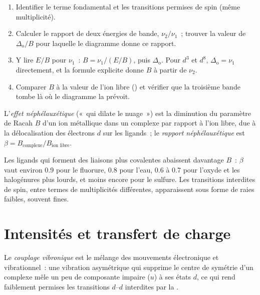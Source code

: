 \begin{method}\label{met:b3:complex-spectra-magnetism:read-ts}
\begin{enumerate}
  \item Identifier le terme fondamental et les transitions permises de spin
        (même multiplicité).
  \item Calculer le rapport de deux énergies de bande, $\nu_2/\nu_1$~;
        trouver la valeur de $\Delta_{\mathrm o}/B$ pour laquelle le diagramme
        donne ce rapport.
  \item Y lire $E/B$ pour $\nu_1$~: $B = \nu_1/(E/B)$, puis $\Delta_{\mathrm o}$.
        Pour $d^3$ et $d^8$, $\Delta_{\mathrm o} = \nu_1$ directement, et la
        formule explicite donne $B$ à partir de $\nu_2$.
  \item Comparer $B$ à la valeur de l'ion libre ()
        et vérifier que la troisième bande tombe là où le diagramme la
        prévoit.
\end{enumerate}
\end{method}

\begin{definition}\label{def:b3:complex-spectra-magnetism:nephelauxetic}
L'\emph{effet néphélauxétique} («~qui dilate le
nuage~») est la diminution du paramètre de Racah $B$ d'un ion métallique dans
un complexe par rapport à l'ion libre, due à la délocalisation des
électrons $d$ sur les ligands~; le \emph{rapport néphélauxétique} est $\beta =
B_{\text{complexe}}/B_{\text{ion libre}}$.
\end{definition}

Les ligands qui forment des liaisons plus covalentes abaissent davantage
$B$~: $\beta$ vaut environ 0.9 pour le fluorure, 0.8 pour l'eau, 0.6 à 0.7
pour l'oxyde et les halogénures plus lourds, et moins encore pour le
sulfure. Les transitions interdites de spin, entre termes de multiplicités
différentes, apparaissent sous forme de raies faibles, souvent fines.

\section{Intensités et transfert de charge}

\begin{definition}\label{def:b3:complex-spectra-magnetism:vibronic-coupling}
Le \emph{couplage vibronique} est le mélange des
mouvements électronique et vibrationnel~: une vibration asymétrique qui
supprime le centre de symétrie d'un complexe mêle un peu de composante
impaire ($u$) à ses états $d$, ce qui rend faiblement permises les
transitions $d$--$d$ interdites par la .
\end{definition}

